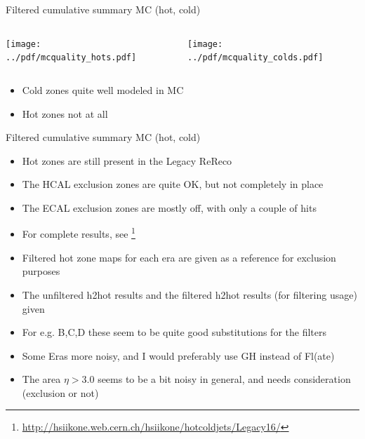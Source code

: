 \documentclass[9pt]{beamer}
\begin{document}
\begin{frame}[t]{Filtered cumulative summary MC (hot, cold)}
\begin{columns}[T]
  \begin{column}{.5\textwidth}
  \texttt{[image: ../pdf/mcquality\_hots.pdf]}
  \end{column}
  \begin{column}{.5\textwidth}
  \texttt{[image: ../pdf/mcquality\_colds.pdf]}
  \end{column}
\end{columns}
\begin{itemize}
 \item Cold zones quite well modeled in MC
 \item Hot zones not at all
\end{itemize}
\end{frame}

\begin{frame}[t]{Filtered cumulative summary MC (hot, cold)}
\begin{itemize}
 \item Hot zones are still present in the Legacy ReReco
 \item The HCAL exclusion zones are quite OK, but not completely in place
 \item The ECAL exclusion zones are mostly off, with only a couple of hits
 \item For complete results, see \footnote{\url{http://hsiikone.web.cern.ch/hsiikone/hotcoldjets/Legacy16/}}
 \item Filtered hot zone maps for each era are given as a reference for exclusion purposes
 \item The unfiltered h2hot results and the filtered h2hot results (for filtering usage) given
 \item For e.g. B,C,D these seem to be quite good substitutions for the filters
 \item Some Eras more noisy, and I would preferably use GH instead of Fl(ate)
 \item The area $\eta > 3.0$ seems to be a bit noisy in general, and needs consideration (exclusion or not)
\end{itemize}
\end{frame}
\end{document}
